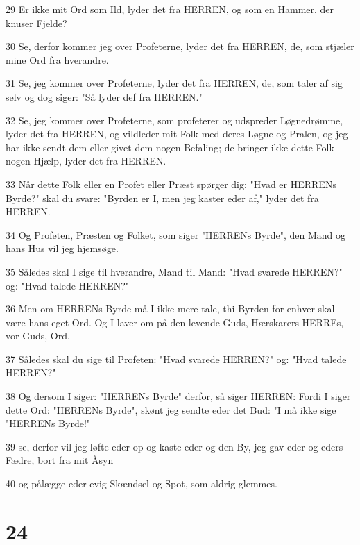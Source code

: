 \par 29 Er ikke mit Ord som Ild, lyder det fra HERREN, og som en Hammer, der knuser Fjelde?
\par 30 Se, derfor kommer jeg over Profeterne, lyder det fra HERREN, de, som stjæler mine Ord fra hverandre.
\par 31 Se, jeg kommer over Profeterne, lyder det fra HERREN, de, som taler af sig selv og dog siger: "Så lyder def fra HERREN."
\par 32 Se, jeg kommer over Profeterne, som profeterer og udspreder Løgnedrømme, lyder det fra HERREN, og vildleder mit Folk med deres Løgne og Pralen, og jeg har ikke sendt dem eller givet dem nogen Befaling; de bringer ikke dette Folk nogen Hjælp, lyder det fra HERREN.
\par 33 Når dette Folk eller en Profet eller Præst spørger dig: "Hvad er HERRENs Byrde?" skal du svare: "Byrden er I, men jeg kaster eder af," lyder det fra HERREN.
\par 34 Og Profeten, Præsten og Folket, som siger "HERRENs Byrde", den Mand og hans Hus vil jeg hjemsøge.
\par 35 Således skal I sige til hverandre, Mand til Mand: "Hvad svarede HERREN?" og: "Hvad talede HERREN?"
\par 36 Men om HERRENs Byrde må I ikke mere tale, thi Byrden for enhver skal være hans eget Ord. Og I laver om på den levende Guds, Hærskarers HERREs, vor Guds, Ord.
\par 37 Således skal du sige til Profeten: "Hvad svarede HERREN?" og: "Hvad talede HERREN?"
\par 38 Og dersom I siger: "HERRENs Byrde" derfor, så siger HERREN: Fordi I siger dette Ord: "HERRENs Byrde", skønt jeg sendte eder det Bud: "I må ikke sige "HERRENs Byrde!"
\par 39 se, derfor vil jeg løfte eder op og kaste eder og den By, jeg gav eder og eders Fædre, bort fra mit Åsyn
\par 40 og pålægge eder evig Skændsel og Spot, som aldrig glemmes.

\chapter{24}

